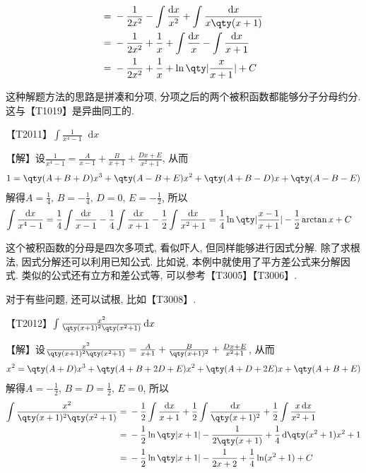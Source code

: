 \documentclass{ctexbook}
\newcommand*{\dif}{\mathop{}\!\mathrm{d}}
\begin{document}
{\begin{align*}
={}&-\frac{1}{2x^{2}}-\int\frac{\dif{x}}{x^{2}}+\int\frac{\dif{x}}{x\qty(x+1)}\\
={}&-\frac{1}{2x^{2}}+\frac{1}{x}+\int\frac{\dif{x}}{x}-\int\frac{\dif{x}}{x+1}\\
={}&-\frac{1}{2x^{2}}+\frac{1}{x}+\ln\qty|\frac{x}{x+1}|+C
\end{align*}\par
{\kaishu 这种解题方法的思路是拼凑和分项, 分项之后的两个被积函数都能够分子分母约分. 这与{\color{red}【T1019】}是异曲同工的. \par}
{\color{red}【T2011】}$\int\frac{1}{x^{4}-1}\dif{x}$\par
【解】设$\frac{1}{x^{4}-1}=\frac{A}{x-1}+\frac{B}{x+1}+\frac{Dx+E}{x^{2}+1}$, 从而
\begin{align*}
1=\qty(A+B+D)x^{3}+\qty(A-B+E)x^{2}+\qty(A+B-D)x+\qty(A-B-E)
\end{align*}
解得$A=\frac{1}{4},\,B=-\frac{1}{4},\,D=0,\,E=-\frac{1}{2}$, 所以
\begin{align*}
\int\frac{\dif{x}}{x^{4}-1}={}&\frac{1}{4}\int\frac{\dif{x}}{x-1}-\frac{1}{4}\int\frac{\dif{x}}{x+1}-\frac{1}{2}\int\frac{\dif{x}}{x^{2}+1}
=\frac{1}{4}\ln\qty|\frac{x-1}{x+1}|-\frac{1}{2}\arctan{x}+C
\end{align*}\par
{\kaishu 这个被积函数的分母是四次多项式, 看似吓人, 但同样能够进行因式分解. 除了求根法, 因式分解还可以利用已知公式. 比如说, 本例中就使用了平方差公式来分解因式. 类似的公式还有立方和差公式等, 可以参考{\color{red}【T3005】}{\color{red}【T3006】}. \par
对于有些问题, 还可以试根, 比如【T3008】. \par}
{\color{red}【T2012】}$\int\frac{x^{2}}{\qty(x+1)^{2}\qty(x^{2}+1)}\dif{x}$\par
【解】设$\frac{x^{2}}{\qty(x+1)^{2}\qty(x^{2}+1)}=\frac{A}{x+1}+\frac{B}{\qty(x+1)^{2}}+\frac{Dx+E}{x^{2}+1}$, 从而
\begin{align*}
x^{2}=\qty(A+D)x^{3}+\qty(A+B+2D+E)x^{2}+\qty(A+D+2E)x+\qty(A+B+E)
\end{align*}
解得$A=-\frac{1}{2},\,B=D=\frac{1}{2},\,E=0$, 所以
\begin{align*}
\int\frac{x^{2}}{\qty(x+1)^{2}\qty(x^{2}+1)}={}&-\frac{1}{2}\int\frac{\dif{x}}{x+1}+\frac{1}{2}\int\frac{\dif{x}}{\qty(x+1)^{2}}+\frac{1}{2}\int\frac{x\dif{x}}{x^{2}+1}\\
={}&-\frac{1}{2}\ln\qty|x+1|-\frac{1}{2\qty(x+1)}+\frac{1}{4}\dif{\qty(x^{2}+1)}{x^{2}+1}\\
={}&-\frac{1}{2}\ln\qty|x+1|-\frac{1}{2x+2}+\frac{1}{4}\ln(x^{2}+1)+C

\end{align*}}
\end{document}
